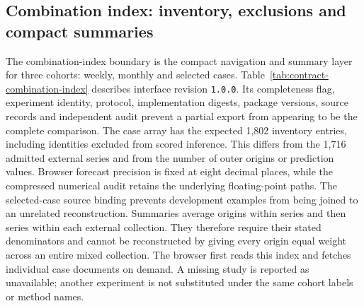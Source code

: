 \subsection{Combination index: inventory, exclusions and compact summaries}
\label{sec:contract-combination-index}
The combination-index boundary is the compact navigation and summary layer for three cohorts: weekly, monthly and selected cases. Table~\ref{tab:contract-combination-index} describes interface revision \texttt{1.0.0}. Its completeness flag, experiment identity, protocol, implementation digests, package versions, source records and independent audit prevent a partial export from appearing to be the complete comparison. The case array has the expected 1,802 inventory entries, including identities excluded from scored inference. This differs from the 1,716 admitted external series and from the number of outer origins or prediction values. Browser forecast precision is fixed at eight decimal places, while the compressed numerical audit retains the underlying floating-point paths. The selected-case source binding prevents development examples from being joined to an unrelated reconstruction. Summaries average origins within series and then series within each external collection. They therefore require their stated denominators and cannot be reconstructed by giving every origin equal weight across an entire mixed collection. The browser first reads this index and fetches individual case documents on demand. A missing study is reported as unavailable; another experiment is not substituted under the same cohort labels or method names.


